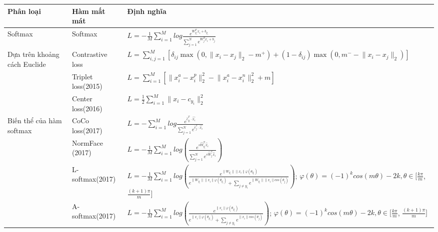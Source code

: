 \begin{table}[]
    \renewcommand{\arraystretch}{1.5}
    \small
    
    \centering
    
    \begin{tabular}{|p{2cm}|l|p{9cm}|}
        \hline
        \textbf{Phân loại} & \textbf{Hàm mất mát} & \textbf{Định nghĩa}  \\
        \hline
        Softmax& Softmax & $L = -\frac{1}{M}\sum_{i=1}^M log\frac{e^{W_{y_i}^Tx_i+b_{y_i}}}{\sum_{j=1}^N e^{W_j^T x_i+b_j}}$ \\
        \hline
        \multirow[c]{3}{2cm}{Dựa trên \newline khoảng cách Euclide}& Contrastive loss\cite{20_WANG2021215} & $L=\sum_{i,j=1}^M [\delta_{ij}\max(0,\lVert x_i-x_j\rVert_2-m^+) + (1-\delta_{ij})\max(0,m^- - \lVert x_i-x_j\rVert_2)]$\\
        & Triplet loss(2015)\cite{39_Schroff_2015_CVPR}& $L= \sum_{i=1}^M[\lVert x_i^a - x_i^p\rVert^2_2 - \lVert x_i^a - x_i^n\rVert^2_2 + m]$ \\
        & Center loss(2016)\cite{LOSS_Center_10.1007/978-3-319-46478-7_31} & $L = \frac{1}{2}\sum_{i=1}^M \lVert x_i-c_{y_i}\rVert^2_2$\\
        \hline
        \multirow[c]{4}{2cm}{Biến thể \newline của hàm softmax}
        & CoCo loss(2017) \cite{LOSS_liu2017rethinkingfeaturediscriminationpolymerization} & $L = -\sum_{i=1}^Mlog \frac{e^{\hat{c}_{y_i}^T\cdot \hat{x_i} }}{\sum_{j=1}^N e^{\hat{c}_{j}^T\cdot \hat{x_i}}}$\\
        & NormFace (2017)\cite{LOSS_Norm_10.1145/3123266.3123359} & $ L= -\frac{1}{M}\sum_{i=1}^Mlog(\frac{e^{s\hat{W}_{y_i}^T\hat{x}_i}}{\sum_{j=1}^N e^{s\hat{W}_{j}^T\hat{x}_i}})$ \\
        & L-softmax(2017)\cite{LOSS_L_liu_2017_largemargin}&  $L= -\frac{1}{M}\sum_{i=1}^Mlog(\frac{e^{\lVert W_{y_i}\rVert \lVert x_i \rVert \varphi(\theta_{y_i})}}{e^{\lVert W_{y_i}\rVert \lVert x_i \rVert \varphi(\theta_{y_i})}+\sum_{j\ne y_i}e^{\lVert W_{y_i}\rVert \lVert x_i \rVert cos(\theta_{j})}})$; $\varphi(\theta)=(-1)^kcos(m\theta)-2k, \theta\in [\frac{k\pi}{m}$, $\frac{(k+1)\pi}{m}]$\\
        & A-softmax(2017)\cite{10_Liu_2017_CVPR} & $L= -\frac{1}{M}\sum_{i=1}^Mlog(\frac{e^{\lVert x_i \rVert \varphi(\theta_{y_i})}}{e^{ \lVert x_i \rVert \varphi(\theta_{y_i})}+\sum_{j\ne y_i}e^{ \lVert x_i \rVert cos(\theta_{j})}})$; $\varphi(\theta)=(-1)^kcos(m\theta)-2k, \theta\in [\frac{k\pi}{m}$, $\frac{(k+1)\pi}{m}]$\\

\end{tabular}
\end{table}
